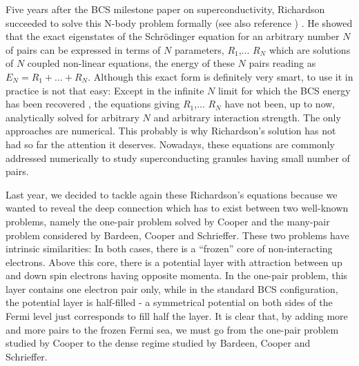 \documentclass[epj]{svjour}
\begin{document}
Five years after the BCS milestone paper\cite{BCS} on superconductivity, Richardson succeeded to solve this N-body problem formally\cite{Richardson1,Richardson2,Richardson1968,Richardson3} (see also reference \cite{gaudin,Ushveridze}) . He showed that 
the exact eigenstates of the Schr\"{o}dinger equation for an arbitrary number $N$ of pairs can be expressed in terms
of $N$ parameters, $R_{1}$,... $R_{N}$ which are solutions of $N$ coupled
non-linear equations, the energy of these $N$ pairs reading as $E
_{N}=R_{1}+...+R_{N}$. Although this exact form is definitely very smart, to
use it in practice is not that easy: Except in the infinite $N$ limit for which the BCS energy has been recovered \cite{Richardson3}, the equations giving $R_{1}$,... $R_{N}$  have not been, up to now, analytically solved for arbitrary $N$ and arbitrary interaction strength. The only approaches are numerical\cite{Duk,ortiz,delft}. This probably is why Richardson's solution has not had so far the
attention it deserves. Nowadays, these equations 
are commonly addressed numerically to study superconducting granules having small number of pairs\cite{Duk,delft2001,sierra2000,schechter2001}. 

Last year, we decided to tackle again these Richardson's equations because we wanted to reveal the deep connection which has to exist between two well-known problems, namely the
one-pair problem solved by Cooper and the many-pair problem considered by Bardeen, Cooper and Schrieffer. 
These two problems have intrinsic similarities: In
both cases, there is a ``frozen'' core of non-interacting electrons. Above this core, there is
a potential layer with attraction between up and
down spin electrons having opposite momenta. In the one-pair problem, this layer contains one electron pair 
only, while in the standard BCS configuration, the potential
layer is half-filled - a symmetrical potential 
on both sides of the Fermi level just corresponds to fill half the layer.
It is clear that, by adding more and more pairs to the frozen Fermi sea, we must go from the one-pair problem studied by Cooper to the dense regime studied by Bardeen, Cooper and Schrieffer. 
\end{document}
